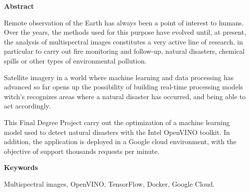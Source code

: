 \begin{center}
{\bf \Huge Abstract}

\end{center}

Remote observation of the Earth has always been a point of interest to humans. Over the years, the methods used for this purpose have evolved until, at present, the analysis of multispectral images constitutes a very active line of research, in particular to carry out fire monitoring and follow-up, natural disasters, chemical spills or other types of environmental pollution.

Satellite imagery in a world where machine learning and data processing has advanced so far opens up the possibility of building real-time processing models witch's recognizes areas where a natural disaster has occurred, and being able to act accordingly.

This Final Degree Project carry out the optimization of a machine learning model used to detect natural disasters with the Intel OpenVINO toolkit. In addition, the application is deployed in a Google cloud environment, with the objective of support thousands requests per minute.



\vspace{0.8cm}
\begin{center}

{\bf \Large Keywords}

\end{center}


Multispectral images, OpenVINO, TensorFlow, Docker, Google Cloud.
\vspace{0.5cm}

\mbox{}
